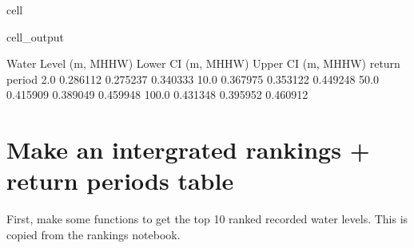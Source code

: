 \documentclass[letterpaper,10pt,english]{jupyterBook}
\begin{document}
\begin{sphinxuseclass}{cell}
\begin{sphinxVerbatimOutput}
\begin{sphinxuseclass}{cell_output}
\begin{sphinxVerbatim}[commandchars=\\\{\}]
               Water Level (m, MHHW)  Lower CI (m, MHHW)  Upper CI (m, MHHW)
return period                                                               
2.0                         0.286112            0.275237            0.340333
10.0                        0.367975            0.353122            0.449248
50.0                        0.415909            0.389049            0.459948
100.0                       0.431348            0.395952            0.460912
\end{sphinxVerbatim}

\end{sphinxuseclass}\end{sphinxVerbatimOutput}

\end{sphinxuseclass}

\section{Make an intergrated rankings + return periods table}
\label{\detokenize{notebooks/regional_and_local/SL_Extremes_annual:make-an-intergrated-rankings-return-periods-table}}
\sphinxAtStartPar
First, make some functions to get the top 10 ranked recorded water levels. This is copied from the rankings notebook.
\end{document}
